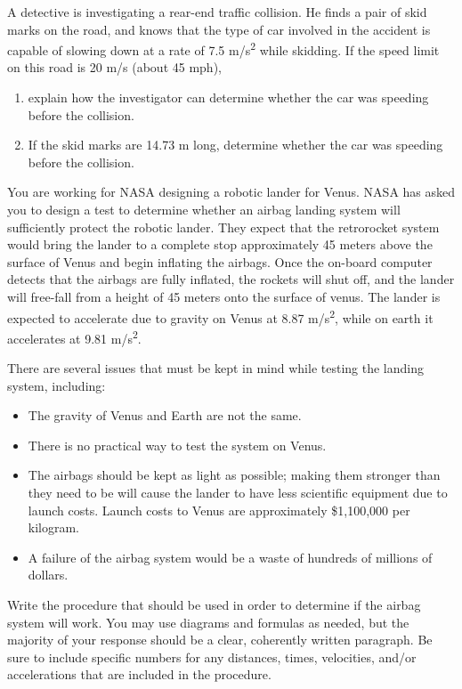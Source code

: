 \documentclass[11pt]{examdesign}
\begin{document}
\begin{shortanswer}[title={Free Response},
	rearrange=no]




\begin{question}
A detective is investigating a rear-end traffic collision.  He finds a pair of skid marks on the road, and knows that the type of car involved in the accident is capable of slowing down at a rate of 7.5 m/s\textsuperscript{2} while skidding.  If the speed limit on this road is 20 m/s (about 45 mph),
	\begin{enumerate}
		\item explain how the investigator can determine whether the car was speeding before the collision.
		\vspace{1 in}
		\item If the skid marks are 14.73 m long, determine whether the car was speeding before the collision.
		\vspace{2 in}
	\end{enumerate}
	\end{question}

\begin{question}
	You are working for NASA designing a robotic lander for Venus.  NASA has asked you to design a test to determine whether an airbag landing system will sufficiently protect the robotic lander.  They expect that the retrorocket system would bring the lander to a complete stop approximately 45 meters above the surface of Venus and begin inflating the airbags.  Once the on-board computer detects that the airbags are fully inflated, the rockets will shut off, and the lander will free-fall from a height of 45 meters onto the surface of venus.  The lander is expected to accelerate due to gravity on Venus at 8.87 m/s\textsuperscript{2}, while on earth it accelerates at 9.81 m/s\textsuperscript{2}.
	
	There are several issues that must be kept in mind while testing the landing system, including:
	\begin{itemize}
		\item The gravity of Venus and Earth are not the same.
		\item There is no practical way to test the system on Venus.
		\item The airbags should be kept as light as possible; making them stronger than they need to be will cause the lander to have less scientific equipment due to launch costs.  Launch costs to Venus are approximately \$1,100,000 per kilogram.
		\item A failure of the airbag system would be a waste of hundreds of millions of dollars.
	\end{itemize}
	Write the procedure that should be used in order to determine if the airbag system will work.  You may use diagrams and formulas as needed, but the majority of your response should be a clear, coherently written paragraph.  Be sure to include specific numbers for any distances, times, velocities, and/or accelerations that are included in the procedure.
	
	
	
\end{question}

	\end{shortanswer}
\end{document}
